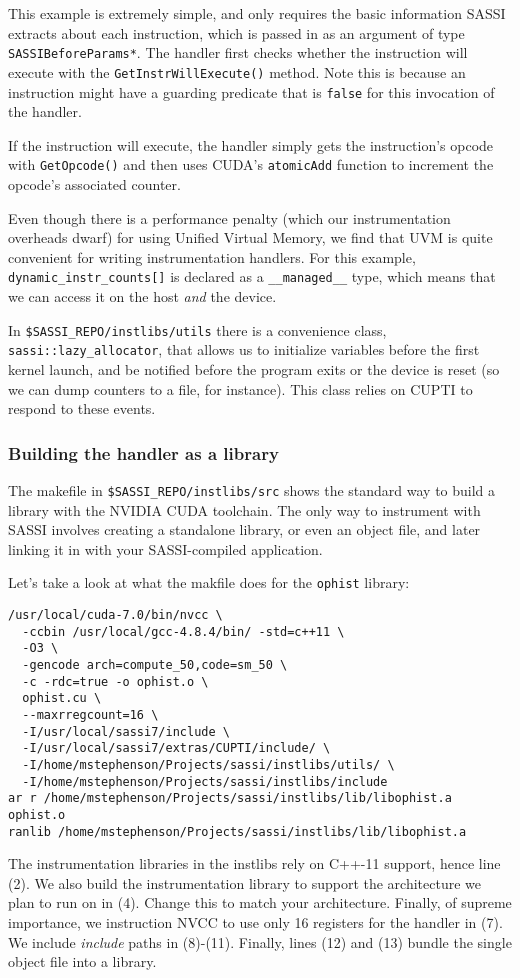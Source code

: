 This example is extremely simple, and only requires the basic
information SASSI extracts about each instruction, which is passed in
as an argument of type \texttt{SASSIBeforeParams*}.  The handler first checks whether
the instruction will execute with the \texttt{GetInstrWillExecute()}
method.  Note this is because an instruction might have a guarding
predicate that is \texttt{false} for this invocation of the handler.

If the instruction will execute, the handler simply gets the
instruction's opcode with \texttt{GetOpcode()} and then uses CUDA's
\texttt{atomicAdd} function to increment the opcode's associated
counter.

Even though there is a performance penalty (which our instrumentation
overheads dwarf) for using Unified Virtual Memory, we find that UVM is
quite convenient for writing instrumentation handlers.  For this
example, \texttt{dynamic\_instr\_counts[]} is declared as a
\texttt{\_\_managed\_\_} type, which means that we can access it on
the host \emph{and} the device.

In \texttt{\$SASSI\_REPO/instlibs/utils} there is a convenience class,
\lstinline{sassi::lazy_allocator}, that allows us to initialize
variables before the first kernel launch, and be notified before the
program exits or the device is reset (so we can dump counters to a
file, for instance).  This class relies on CUPTI to respond to these
events.

\subsubsection{Building the handler as a library}

The makefile in \texttt{\$SASSI\_REPO/instlibs/src} shows the standard
way to build a library with the NVIDIA CUDA toolchain. The only way to
instrument with SASSI involves creating a standalone library, or even
an object file, and later linking it in with your SASSI-compiled
application.

Let's take a look at what the makfile does for the \texttt{ophist}
library:
\begin{lstlisting}[style=BashInputStyle]
/usr/local/cuda-7.0/bin/nvcc \
  -ccbin /usr/local/gcc-4.8.4/bin/ -std=c++11 \
  -O3 \
  -gencode arch=compute_50,code=sm_50 \
  -c -rdc=true -o ophist.o \
  ophist.cu \
  --maxrregcount=16 \
  -I/usr/local/sassi7/include \
  -I/usr/local/sassi7/extras/CUPTI/include/ \
  -I/home/mstephenson/Projects/sassi/instlibs/utils/ \
  -I/home/mstephenson/Projects/sassi/instlibs/include
ar r /home/mstephenson/Projects/sassi/instlibs/lib/libophist.a ophist.o
ranlib /home/mstephenson/Projects/sassi/instlibs/lib/libophist.a
\end{lstlisting}

The instrumentation libraries in the instlibs rely on C++-11 support,
hence line (2).  We also build the instrumentation library to support
the architecture we plan to run on in (4).  Change this to match your
architecture.  Finally, of supreme importance, we instruction NVCC to
use only 16 registers for the handler in (7).  We include
\emph{include} paths in (8)-(11).  Finally, lines (12) and (13) bundle
the single object file into a library.
